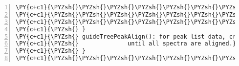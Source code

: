\begin{Verbatim}[commandchars=\\\{\},codes={\catcode`\$=3\catcode`\^=7\catcode`\_=8},gobble=0,numbers=left,fontfamily=fvm,fontshape=n,fontsize=\footnotesize,tabsize=2]
\PY{c+c1}{\PYZsh{}\PYZsh{}\PYZsh{}\PYZsh{}\PYZsh{}\PYZsh{}\PYZsh{}\PYZsh{}\PYZsh{}\PYZsh{}\PYZsh{}\PYZsh{}\PYZsh{}\PYZsh{}\PYZsh{}\PYZsh{}\PYZsh{}\PYZsh{}\PYZsh{}\PYZsh{}\PYZsh{}\PYZsh{}\PYZsh{}\PYZsh{}\PYZsh{}\PYZsh{}\PYZsh{}\PYZsh{}\PYZsh{}\PYZsh{}\PYZsh{}\PYZsh{}\PYZsh{}\PYZsh{}\PYZsh{}\PYZsh{}\PYZsh{}\PYZsh{}\PYZsh{}\PYZsh{}\PYZsh{}\PYZsh{}\PYZsh{}\PYZsh{}\PYZsh{}\PYZsh{}\PYZsh{}\PYZsh{}\PYZsh{}\PYZsh{}\PYZsh{}\PYZsh{}\PYZsh{}\PYZsh{}\PYZsh{}\PYZsh{}\PYZsh{}\PYZsh{}\PYZsh{}\PYZsh{}\PYZsh{}\PYZsh{}\PYZsh{}\PYZsh{}\PYZsh{}\PYZsh{}\PYZsh{}\PYZsh{}\PYZsh{}\PYZsh{}\PYZsh{}\PYZsh{}\PYZsh{}\PYZsh{}\PYZsh{}\PYZsh{}\PYZsh{}\PYZsh{}\PYZsh{}}
\PY{c+c1}{\PYZsh{}\PYZsh{}\PYZsh{}\PYZsh{}\PYZsh{}\PYZsh{}\PYZsh{}\PYZsh{}\PYZsh{}\PYZsh{}\PYZsh{}\PYZsh{}\PYZsh{}\PYZsh{}\PYZsh{}\PYZsh{}\PYZsh{}\PYZsh{}\PYZsh{}\PYZsh{}\PYZsh{}\PYZsh{}\PYZsh{}\PYZsh{}\PYZsh{}\PYZsh{}\PYZsh{}\PYZsh{}\PYZsh{}\PYZsh{}\PYZsh{}\PYZsh{}\PYZsh{}\PYZsh{}\PYZsh{}\PYZsh{}\PYZsh{} Function \PYZsh{}\PYZsh{}\PYZsh{}\PYZsh{}\PYZsh{}\PYZsh{}\PYZsh{}\PYZsh{}\PYZsh{}\PYZsh{}\PYZsh{}\PYZsh{}\PYZsh{}\PYZsh{}\PYZsh{}\PYZsh{}\PYZsh{}\PYZsh{}\PYZsh{}\PYZsh{}\PYZsh{}\PYZsh{}\PYZsh{}\PYZsh{}\PYZsh{}\PYZsh{}\PYZsh{}\PYZsh{}\PYZsh{}\PYZsh{}\PYZsh{}\PYZsh{}}
\PY{c+c1}{\PYZsh{}\PYZsh{}\PYZsh{}\PYZsh{}\PYZsh{}\PYZsh{}\PYZsh{}\PYZsh{}\PYZsh{}\PYZsh{}\PYZsh{}\PYZsh{}\PYZsh{}\PYZsh{}\PYZsh{}\PYZsh{}\PYZsh{}\PYZsh{}\PYZsh{}\PYZsh{}\PYZsh{}\PYZsh{}\PYZsh{}\PYZsh{}\PYZsh{}\PYZsh{}\PYZsh{}\PYZsh{}\PYZsh{}\PYZsh{}\PYZsh{}\PYZsh{}\PYZsh{}\PYZsh{}\PYZsh{}\PYZsh{}\PYZsh{}\PYZsh{}\PYZsh{}\PYZsh{}\PYZsh{}\PYZsh{}\PYZsh{}\PYZsh{}\PYZsh{}\PYZsh{}\PYZsh{}\PYZsh{}\PYZsh{}\PYZsh{}\PYZsh{}\PYZsh{}\PYZsh{}\PYZsh{}\PYZsh{}\PYZsh{}\PYZsh{}\PYZsh{}\PYZsh{}\PYZsh{}\PYZsh{}\PYZsh{}\PYZsh{}\PYZsh{}\PYZsh{}\PYZsh{}\PYZsh{}\PYZsh{}\PYZsh{}\PYZsh{}\PYZsh{}\PYZsh{}\PYZsh{}\PYZsh{}\PYZsh{}\PYZsh{}\PYZsh{}\PYZsh{}\PYZsh{}}
\PY{c+c1}{\PYZsh{} }
\PY{c+c1}{\PYZsh{} guideTreePeakAlign(): for peak list data, create successive N\PYZhy{} and M\PYZhy{}alignments}
\PY{c+c1}{\PYZsh{}              until all spectra are aligned.}
\PY{c+c1}{\PYZsh{} }
\PY{c+c1}{\PYZsh{}\PYZsh{}\PYZsh{}\PYZsh{}\PYZsh{}\PYZsh{}\PYZsh{}\PYZsh{}\PYZsh{}\PYZsh{}\PYZsh{}\PYZsh{}\PYZsh{}\PYZsh{}\PYZsh{}\PYZsh{}\PYZsh{}\PYZsh{}\PYZsh{}\PYZsh{}\PYZsh{}\PYZsh{}\PYZsh{}\PYZsh{}\PYZsh{}\PYZsh{}\PYZsh{}\PYZsh{}\PYZsh{}\PYZsh{}\PYZsh{}\PYZsh{}\PYZsh{}\PYZsh{}\PYZsh{}\PYZsh{}\PYZsh{}\PYZsh{}\PYZsh{}\PYZsh{}\PYZsh{}\PYZsh{}\PYZsh{}\PYZsh{}\PYZsh{}\PYZsh{}\PYZsh{}\PYZsh{}\PYZsh{}\PYZsh{}\PYZsh{}\PYZsh{}\PYZsh{}\PYZsh{}\PYZsh{}\PYZsh{}\PYZsh{}\PYZsh{}\PYZsh{}\PYZsh{}\PYZsh{}\PYZsh{}\PYZsh{}\PYZsh{}\PYZsh{}\PYZsh{}\PYZsh{}\PYZsh{}\PYZsh{}\PYZsh{}\PYZsh{}\PYZsh{}\PYZsh{}\PYZsh{}\PYZsh{}\PYZsh{}\PYZsh{}\PYZsh{}\PYZsh{}}

\end{Verbatim}
